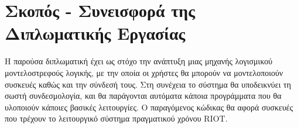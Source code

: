 \section{Σκοπός - Συνεισφορά της Διπλωματικής Εργασίας}
\label{section:contribution}

Η παρούσα διπλωματική έχει ως στόχο την ανάπτυξη μιας μηχανής λογισμικού μοντελοστρεφούς λογικής, με την οποία οι χρήστες θα μπορούν να μοντελοποιούν συσκευές καθώς και την σύνδεσή τους. Στη συνέχεια το σύστημα θα υποδεικνύει τη σωστή συνδεσμολογία, και θα παράγονται αυτόματα κάποια προγράμματα που θα υλοποιούν κάποιες βασικές λειτουργίες. Ο παραγόμενος κώδικας θα αφορά συσκευές που τρέχουν το λειτουργικό σύστημα πραγματικού χρόνου RIOT.